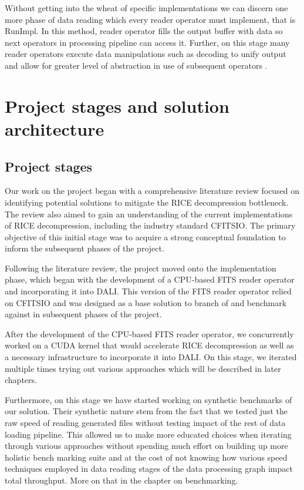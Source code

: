 \documentclass[licencjacka,en]{pracamgr}
\begin{document}
Without getting into the wheat of specific implementations we can discern one more phase of data reading which every reader operator must implement, that is RunImpl. In this method, reader operator fills the output buffer with data so next operators in processing pipeline can access it. Further, on this stage many reader operators execute data manipulations such as decoding to unify output and allow for greater level of abstraction in use of subsequent operators \cite{dali-readers}. 

\chapter{Project stages and solution architecture}\label{r:impl}

\section{Project stages}
Our work on the project began with a comprehensive literature review focused on identifying potential solutions to mitigate the RICE decompression bottleneck. The review also aimed to gain an understanding of the current implementations of RICE decompression, including the industry standard CFITSIO. The primary objective of this initial stage was to acquire a strong conceptual foundation to inform the subsequent phases of the project.

Following the literature review, the project moved onto the implementation phase, which began with the development of a CPU-based FITS reader operator and incorporating it into DALI. This version of the FITS reader operator relied on CFITSIO and was designed as a base solution to branch of and  benchmark against in subsequent phases of the project. 

After the development of the CPU-based FITS reader operator, we concurrently worked on a CUDA kernel that would accelerate RICE decompression as well as a necessary infrastructure to incorporate it into DALI. On this stage, we iterated multiple times trying out various approaches which will be described in later chapters.

Furthermore, on this stage we have started working on synthetic benchmarks of our solution. Their synthetic nature stem from the fact that we tested just the raw speed of reading generated files without testing impact of the rest of data loading pipeline. This allowed us to make more educated choices when iterating through various approaches without spending much effort on building up more holistic bench marking suite and at the cost of not knowing how various speed techniques employed in data reading stages of the data processing graph impact total throughput. More on that in the chapter on benchmarking. 
\end{document}
